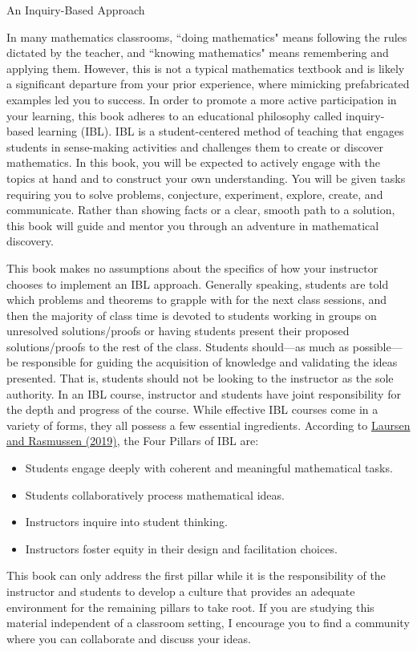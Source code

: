 \begin{section}{An Inquiry-Based Approach}

In many mathematics classrooms, ``doing mathematics" means following the rules dictated by the teacher, and ``knowing mathematics" means remembering and applying them. However, this is not a typical mathematics textbook and is likely a significant departure from your prior experience, where mimicking prefabricated examples led you to success. In order to promote a more active participation in your learning, this book adheres to an educational philosophy called inquiry-based learning (IBL). IBL is a student-centered method of teaching that engages students in sense-making activities and challenges them to create or discover mathematics.  In this book, you will be expected to actively engage with the topics at hand and to construct your own understanding.  You will be given tasks requiring you to solve problems, conjecture, experiment, explore, create, and communicate.  Rather than showing facts or a clear, smooth path to a solution, this book will guide and mentor you through an adventure in mathematical discovery. 

This book makes no assumptions about the specifics of how your instructor chooses to implement an IBL approach. Generally speaking, students are told which problems and theorems to grapple with for the next class sessions, and then the majority of class time is devoted to students working in groups on unresolved solutions/proofs or having students present their proposed solutions/proofs to the rest of the class. Students should---as much as possible---be responsible for guiding the acquisition of knowledge and validating the ideas presented. That is, students should not be looking to the instructor as the sole authority. In an IBL course, instructor and students have joint responsibility for the depth and progress of the course. While effective IBL courses come in a variety of forms, they all possess a few essential ingredients. According to \href{https://www.colorado.edu/eer/sites/default/files/attached-files/laursenrasmussencommentaryauthorversion0219.pdf}{Laursen and Rasmussen (2019)}, the Four Pillars of IBL are:
\begin{itemize}
\item Students engage deeply with coherent and meaningful mathematical tasks.
\item Students collaboratively process mathematical ideas.
\item Instructors inquire into student thinking.
\item Instructors foster equity in their design and facilitation choices.
\end{itemize}
This book can only address the first pillar while it is the responsibility of the instructor and students to develop a culture that provides an adequate environment for the remaining pillars to take root.  If you are studying this material independent of a classroom setting, I encourage you to find a community where you can collaborate and discuss your ideas.


\end{section}
